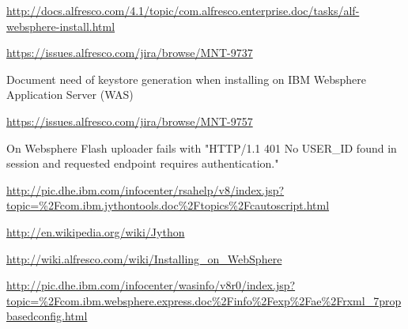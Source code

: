 \documentclass[10pt,a4]{article}
\begin{document}
\begin{thebibliography}{9}

\url{http://docs.alfresco.com/4.1/topic/com.alfresco.enterprise.doc/tasks/alf-websphere-install.html}

\url{https://issues.alfresco.com/jira/browse/MNT-9737} 

Document need of keystore generation when installing on IBM Websphere Application Server (WAS)

\url{https://issues.alfresco.com/jira/browse/MNT-9757} 

On Websphere Flash uploader fails with "HTTP/1.1 401 No USER\_ID found in session and requested endpoint requires authentication."


\url{http://pic.dhe.ibm.com/infocenter/rsahelp/v8/index.jsp?topic=\%2Fcom.ibm.jythontools.doc\%2Ftopics\%2Fcautoscript.html}


\url{http://en.wikipedia.org/wiki/Jython}

\url{http://wiki.alfresco.com/wiki/Installing_on_WebSphere}


\url{http://pic.dhe.ibm.com/infocenter/wasinfo/v8r0/index.jsp?topic=\%2Fcom.ibm.websphere.express.doc\%2Finfo\%2Fexp\%2Fae\%2Frxml_7propbasedconfig.html}

 \end{thebibliography}
\end{document}
